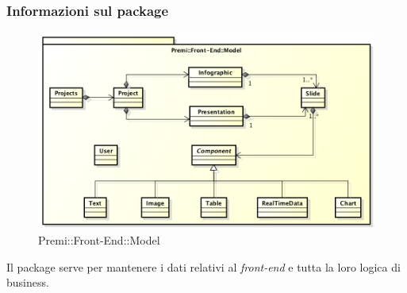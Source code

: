 	\subsubsection*{Informazioni sul package}
		\begin{figure}[h]
			\centering
			\includegraphics[width=0.9\linewidth]{img/front-end_model}
			\caption[Premi::Front-End::Model]{Premi::Front-End::Model}
		\end{figure}
		Il package serve per mantenere i dati relativi al \textit{\gls{front-end}} e tutta la loro logica di \gls{business}.

